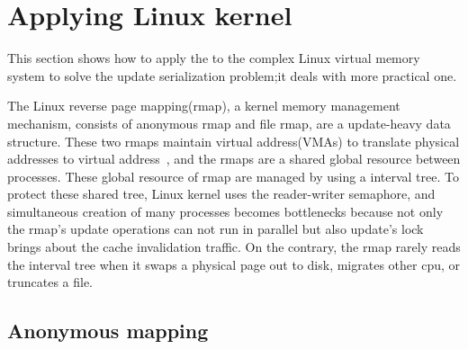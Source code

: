 \section{Applying Linux kernel}
\label{sec:linux}



This section shows how to apply the \LDU to the complex Linux
virtual memory system 
to solve the update serialization problem;it deals with more practical one.

The Linux reverse page mapping(rmap), a kernel memory management mechanism, consists
of anonymous rmap and file rmap, are a update-heavy data structure.
These two rmaps maintain virtual address(VMAs) to translate physical
addresses to virtual address~\cite{Dave2004OLSRMAP}, and the rmaps are a shared global resource between processes.
These global resource of rmap are managed by using a interval tree.
To protect these shared tree, Linux kernel uses the reader-writer semaphore, and simultaneous creation of many processes becomes bottlenecks because
not only the rmap's update operations can not run
in parallel but also update's lock brings about the cache invalidation traffic.
On the contrary, the rmap rarely reads the interval tree when it swaps a physical page
out to disk, migrates other cpu, or truncates a file.

\subsection{Anonymous mapping}

